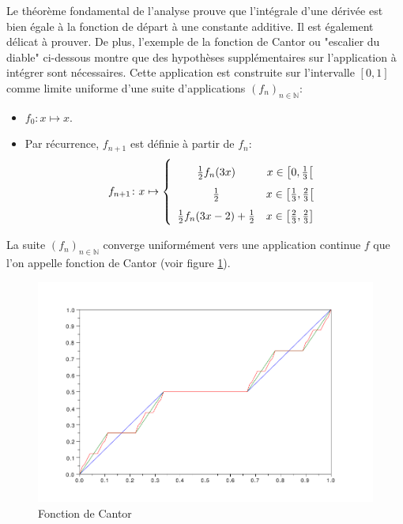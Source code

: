 Le théorème fondamental de l'analyse prouve que l'intégrale d'une dérivée est
bien égale à la fonction de départ à une constante additive. Il est également
délicat à prouver.
De plus, l'exemple de la fonction de Cantor ou "escalier du diable" ci-dessous
montre que des hypothèses supplémentaires sur l'application à intégrer sont
nécessaires. Cette application est construite sur l'intervalle $[0,1]$ comme
limite uniforme d'une suite d'applications $(f_n)_{n \in \mathbb{N}}$:
\begin{itemize}
  \item $f_0 \colon x \mapsto x$.
  \item Par récurrence, $f_{n+1}$ est définie à partir de $f_n$:
  \[
  f_{n+1} \colon x \mapsto \left \{ 
  	\begin{array}{cc}
  		\rule[-0.5em]{0pt}{2em} \frac{1}{2} f_n(3x) & x \in
  		 \left[0, \frac{1}{3}\right[ \\ 
  		 \rule[-0.5em]{0pt}{2em} \frac{1}{2} & x \in \left[\frac{1}{3},
  		\frac{2}{3}\right[ \\ 
  		\rule[-0.5em]{0pt}{2em} \frac{1}{2}f_n(3x-2)+ \frac{1}{2} & x \in
  		\left[\frac{2}{3}, \frac{2}{3}\right]
  	\end{array}
  \right.
  \]
\end{itemize}
La suite $(f_n)_{n \in \mathbb{N}}$ converge uniformément vers une application
continue $f$ que l'on appelle fonction de Cantor (voir figure \ref{ch6:fig1}). 
\begin{figure}[hb]
\begin{center}
\includegraphics[scale=0.5]{images/cantor.pdf}
\caption{Fonction de Cantor}\label{ch6:fig1}
\end{center}
\end{figure}
